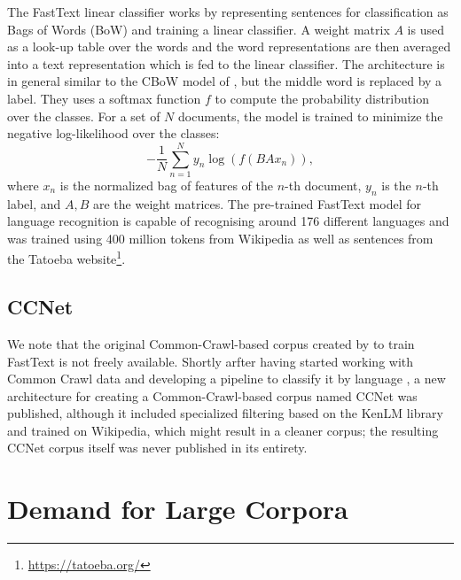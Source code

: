 The FastText linear classifier works by representing sentences for classification as Bags of Words (BoW) and training a linear classifier. A weight matrix $A$ is used as a look-up table over the words and the word representations are then averaged into a text representation which is fed to the linear classifier. The architecture is in general similar to the CBoW model of \citet{mikolov-etal-2013-distributed}, but the middle word is replaced by a label. They uses a softmax function $f$ to compute the probability distribution over the classes. For a set of $N$ documents, the model is trained to minimize the negative log-likelihood over the classes:
\[
    -\frac{1}{N}\sum_{n=1}^{N} y_n\log\left(f(BAx_n)\right),
\]
where $x_n$ is the normalized bag of features of the $n$-th document, $y_n$ is the $n$-th label, and $A,B$ are the weight matrices. The pre-trained FastText model for language recognition \citep{grave-etal-2018-learning} is capable of recognising around 176 different languages and was trained using 400 million tokens from Wikipedia as well as sentences from the Tatoeba website\footnote{\url{https://tatoeba.org/}}.

\subsection{CCNet}

We note that the original Common-Crawl-based corpus created by \citet{grave-etal-2018-learning} to train FastText is not freely available. Shortly arfter having started working with Common Crawl data and developing a pipeline to classify it by language \citep{ortiz-suarez-etal-2019-asynchronous}, a new architecture for creating a Common-Crawl-based corpus named CCNet \citep{wenzek-etal-2020-ccnet} was published, although it included specialized filtering based on the KenLM library \citep{heafield-2011-kenlm} and trained on Wikipedia, which might result in a cleaner corpus; the resulting CCNet corpus itself was never published in its entirety.


\section{Demand for Large Corpora}

